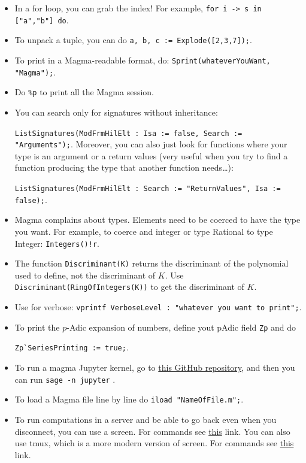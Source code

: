 \documentclass[12pt]{article}
\begin{document}
\begin{itemize}
\item In a for loop, you can grab the index! For example, \verb|for i -> s in ["a","b"] do|.

\item To unpack a tuple, you can do \verb|a, b, c := Explode([2,3,7]);|. 
\item To print in a \textsf{Magma}-readable format, do: \verb|Sprint(whateverYouWant, "Magma");|.
\item Do \verb|%p| to print all the Magma session.
\item You can search only for signatures without inheritance:

\verb|ListSignatures(ModFrmHilElt : Isa := false, Search := "Arguments");|.  Moreover, you can also just look for functions where your type is an argument or a return values (very useful when you try to find a function producing the type that another function needs…):

\verb|ListSignatures(ModFrmHilElt : Search := "ReturnValues", Isa := false);|.

\item \textsf{Magma} complains about types.  Elements need to be coerced to have the type you want. For example, to coerce and integer or type Rational  to type Integer: \verb|Integers()!r|.

\item The function \verb|Discriminant(K)| returns the discriminant of the polynomial used to define, not the discriminant of $K$. Use \verb|Discriminant(RingOfIntegers(K))| to get the discriminant of $K$.

\item Use for verbose: \verb|vprintf VerboseLevel : "whatever you want to print";|.

\item To print the $p$-Adic expansion of numbers, define yout pAdic field \verb|Zp| and do 

\verb|Zp`SeriesPrinting := true;|.


\item To run a magma Jupyter kernel, go to \href{https://github.com/edgarcosta/magma_kernel}{this GitHub repository}, and then you can run \verb|sage -n jupyter| .


\item To load a \textsf{Magma} file line by line do \verb|iload "NameOfFile.m";|.

\item To run computations in a server and be able to go back even when you disconnect, you can use a screen.  For commands see \href{https://linuxize.com/post/how-to-use-linux-screen/}{this} link.  You can also use tmux, which is a more modern version of screen.  For commands see \href{https://linuxize.com/post/getting-started-with-tmux/}{this} link.


\end{itemize}
\end{document}
